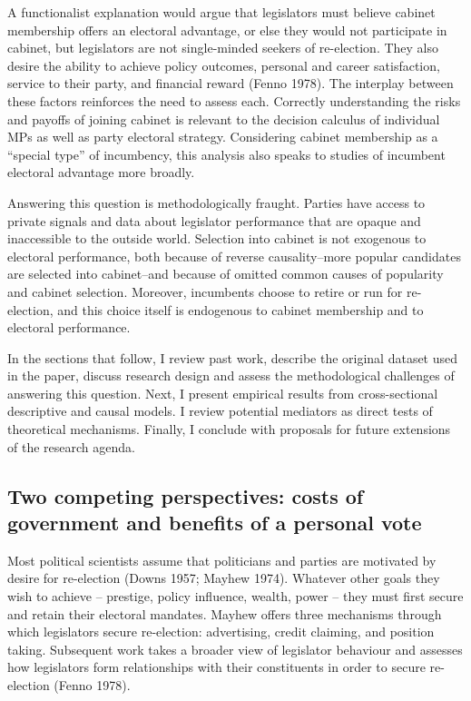 \documentclass[letter,12pt]{article}
\begin{document}
A functionalist explanation would argue that legislators must believe cabinet membership offers an electoral advantage, or else they would not participate in cabinet, but legislators are not single-minded seekers of re-election. They also desire the ability to achieve policy outcomes, personal and career satisfaction, service to their party, and financial reward (Fenno 1978). The interplay between these factors reinforces the need to assess each. Correctly understanding the risks and payoffs of joining cabinet is relevant to the decision calculus of individual MPs as well as party electoral strategy. Considering cabinet membership as a ``special type'' of incumbency, this analysis also speaks to studies of incumbent electoral advantage more broadly.

Answering this question is methodologically fraught. Parties have access to private signals and data about legislator performance that are opaque and inaccessible to the outside world. Selection into cabinet is not exogenous to electoral performance, both because of reverse causality--more popular candidates are selected into cabinet--and because of omitted common causes of popularity and cabinet selection. Moreover, incumbents choose to retire or run for re-election, and this choice itself is endogenous to cabinet membership and to electoral performance.

In the sections that follow, I review past work, describe the original dataset used in the paper, discuss research design and assess the methodological challenges of answering this question. Next, I present empirical results from cross-sectional descriptive and causal models. I review potential mediators as direct tests of theoretical mechanisms. Finally, I conclude with proposals for future extensions of the research agenda.

\subsection*{Two competing perspectives: costs of government and benefits of a personal vote}

Most political scientists assume that politicians and parties are motivated by desire for re-election (Downs 1957; Mayhew 1974). Whatever other goals they wish to achieve -- prestige, policy influence, wealth, power -- they must first secure and retain their electoral mandates. Mayhew offers three mechanisms through which legislators secure re-election: advertising, credit claiming, and position taking. Subsequent work takes a broader view of legislator behaviour and assesses how legislators form relationships with their constituents in order to secure re-election (Fenno 1978).
\end{document}
